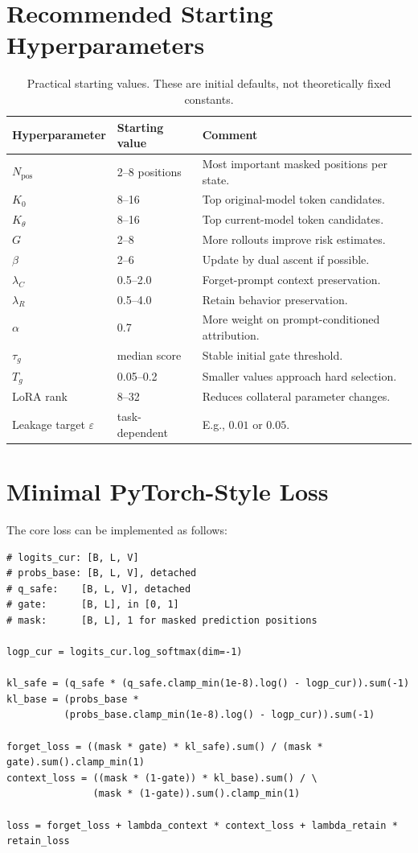 \documentclass[10pt]{article}
\newcommand{\1}{\mathbb{I}}
\begin{document}
\section{Recommended Starting Hyperparameters}

\begin{table}[t]
\centering
\caption{Practical starting values. These are initial defaults, not theoretically fixed constants.}
\label{tab:hparams}
\small
\begin{tabular}{lll}
\toprule
Hyperparameter & Starting value & Comment \\
\midrule
$N_{\mathrm{pos}}$ & 2--8 positions & Most important masked positions per state. \\
$K_0$ & 8--16 & Top original-model token candidates. \\
$K_\theta$ & 8--16 & Top current-model token candidates. \\
$G$ & 2--8 & More rollouts improve risk estimates. \\
$\beta$ & 2--6 & Update by dual ascent if possible. \\
$\lambda_C$ & 0.5--2.0 & Forget-prompt context preservation. \\
$\lambda_R$ & 0.5--4.0 & Retain behavior preservation. \\
$\alpha$ & 0.7 & More weight on prompt-conditioned attribution. \\
$\tau_g$ & median score & Stable initial gate threshold. \\
$T_g$ & 0.05--0.2 & Smaller values approach hard selection. \\
LoRA rank & 8--32 & Reduces collateral parameter changes. \\
Leakage target $\varepsilon$ & task-dependent & E.g., $0.01$ or $0.05$. \\
\bottomrule
\end{tabular}
\end{table}

\section{Minimal PyTorch-Style Loss}

The core loss can be implemented as follows:
\begin{verbatim}
# logits_cur: [B, L, V]
# probs_base: [B, L, V], detached
# q_safe:    [B, L, V], detached
# gate:      [B, L], in [0, 1]
# mask:      [B, L], 1 for masked prediction positions

logp_cur = logits_cur.log_softmax(dim=-1)

kl_safe = (q_safe * (q_safe.clamp_min(1e-8).log() - logp_cur)).sum(-1)
kl_base = (probs_base *
          (probs_base.clamp_min(1e-8).log() - logp_cur)).sum(-1)

forget_loss = ((mask * gate) * kl_safe).sum() / (mask * gate).sum().clamp_min(1)
context_loss = ((mask * (1-gate)) * kl_base).sum() / \
               (mask * (1-gate)).sum().clamp_min(1)

loss = forget_loss + lambda_context * context_loss + lambda_retain * retain_loss
\end{verbatim}
\end{document}
